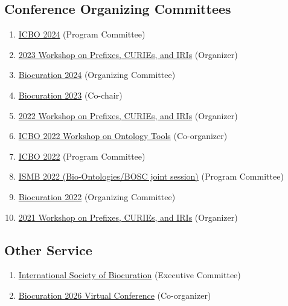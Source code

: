 \documentclass[10pt,a4paper,sans]{moderncv} %
\begin{document}
    \subsection{Conference Organizing Committees}\label{sec:conference-organization}
    \begin{enumerate}
        \item \href{https://icbo-conference.github.io/icbo2024/}{ICBO 2024} (Program Committee)
        \item \href{https://biopragmatics.github.io/workshops/WPCI2023.html}{2023 Workshop on Prefixes, CURIEs, and IRIs} (Organizer)
        \item \href{https://bioregistry.io/wikidata:Q122167907?provider=scholia}{Biocuration 2024} (Organizing Committee)
        \item \href{https://bioregistry.io/wikidata:Q111430238?provider=scholia}{Biocuration 2023} (Co-chair)
        \item \href{https://biopragmatics.github.io/workshops/WPCI2022.html}{2022 Workshop on Prefixes, CURIEs, and IRIs} (Organizer)
        \item \href{https://icbo-conference.github.io/icbo2022/workshops-and-tutorials/#workshop-on-ontology-tools-and-workflows}{ICBO 2022 Workshop on Ontology Tools} (Co-organizer)
        \item \href{https://icbo-conference.github.io/icbo2022/program-committee}{ICBO 2022} (Program Committee)
        \item \href{https://www.iscb.org/ismb2022-program/abstracts/bio-ontologies}{ISMB 2022 (Bio-Ontologies/BOSC joint session)} (Program Committee)
        \item \href{https://bioregistry.io/wikidata:Q109407979?provider=scholia}{Biocuration 2022} (Organizing Committee)
        \item \href{https://biopragmatics.github.io/workshops/WPCI2021.html}{2021 Workshop on Prefixes, CURIEs, and IRIs} (Organizer)
    \end{enumerate}

    \subsection{Other Service}\label{sec:other-service}
    \begin{enumerate}
        \item \href{https://bioregistry.io/wikidata:Q23809291?provider=scholia}{International Society of Biocuration} (Executive Committee)
        \item \href{https://www.biocuration.org/events/biocuration2026-virtual/}{Biocuration 2026 Virtual Conference} (Co-organizer)
    \end{enumerate}
\end{document}
